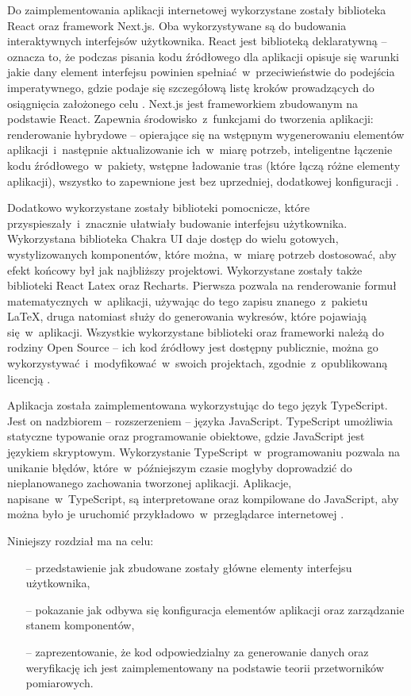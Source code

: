 Do zaimplementowania aplikacji internetowej wykorzystane zostały biblioteka React oraz framework
Next.js. Oba wykorzystywane są do budowania interaktywnych interfejsów użytkownika. React jest
biblioteką deklaratywną -- oznacza to, że podczas pisania kodu źródłowego dla aplikacji opisuje się
warunki jakie dany element interfejsu powinien spełniać~w~przeciwieństwie do podejścia
imperatywnego, gdzie podaje się szczegółową listę kroków prowadzących do osiągnięcia założonego celu
\cite{react-main}. Next.js jest frameworkiem zbudowanym na podstawie React.
Zapewnia środowisko~z~funkcjami do tworzenia aplikacji: renderowanie hybrydowe -- opierające się na
wstępnym wygenerowaniu elementów aplikacji~i~następnie aktualizowanie ich~w~miarę potrzeb,
inteligentne łączenie kodu źródłowego~w~pakiety, wstępne ładowanie tras (które łączą różne elementy
aplikacji), wszystko to zapewnione jest bez uprzedniej, dodatkowej konfiguracji \cite{nextjs-main}.

Dodatkowo wykorzystane zostały biblioteki pomocnicze, które przyspieszały~i~znacznie
ułatwiały budowanie interfejsu użytkownika. Wykorzystana biblioteka Chakra UI daje dostęp do wielu
gotowych, wystylizowanych komponentów, które można,~w~miarę potrzeb dostosować, aby efekt końcowy
był jak najbliższy projektowi. Wykorzystane zostały także biblioteki React Latex oraz Recharts.
Pierwsza pozwala na renderowanie formuł matematycznych~w~aplikacji, używając do tego zapisu
znanego~z~pakietu LaTeX, druga natomiast służy do generowania wykresów, które pojawiają
się~w~aplikacji. Wszystkie wykorzystane biblioteki oraz frameworki należą do rodziny Open Source --
ich kod źródłowy jest dostępny publicznie, można go wykorzystywać~i~modyfikować~w~swoich
projektach, zgodnie~z~opublikowaną licencją \cite{snyk-licences, snyk-mit}.

Aplikacja została zaimplementowana wykorzystując do tego język TypeScript. Jest on nadzbiorem --
rozszerzeniem -- języka JavaScript. TypeScript umożliwia statyczne typowanie oraz programowanie
obiektowe, gdzie JavaScript jest językiem skryptowym. Wykorzystanie TypeScript~w~programowaniu
pozwala na unikanie błędów, które~w~późniejszym czasie mogłyby doprowadzić do nieplanowanego
zachowania tworzonej aplikacji. Aplikacje, napisane~w~TypeScript, są interpretowane oraz
kompilowane do JavaScript, aby można było je uruchomić przykładowo~w~przeglądarce
internetowej \cite{ts-main}.

Niniejszy rozdział ma na celu:
\begin{itemize}
      \item[--] przedstawienie jak zbudowane zostały główne elementy interfejsu użytkownika,
      \item[--] pokazanie jak odbywa się konfiguracja elementów aplikacji oraz zarządzanie stanem
            komponentów,
      \item[--] zaprezentowanie, że kod odpowiedzialny za generowanie danych oraz weryfikację ich
            jest zaimplementowany na podstawie teorii przetworników pomiarowych.
\end{itemize}

